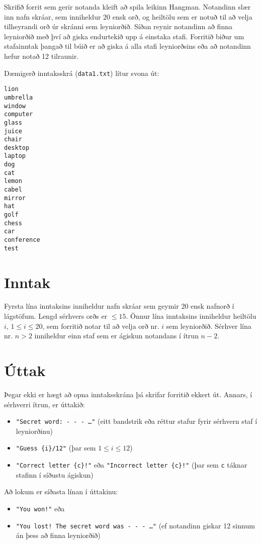 
Skrifið forrit sem gerir notanda kleift að spila leikinn Hangman.
Notandinn slær inn nafn skráar, sem inniheldur 20 ensk orð, og heiltölu sem er notuð til að velja tilheyrandi orð úr skránni sem leyniorðið.
Síðan reynir notandinn að finna leyniorðið með því að giska endurtekið upp á einstaka stafi. 
Forritið biður um stafainntak þangað til búið er að giska á alla stafi leyniorðsins eða að notandinn hefur notað 12 tilraunir.

Dæmigerð inntaksskrá (\texttt{data1.txt}) lítur svona út: 

\begin{verbatim}
lion
umbrella
window
computer
glass
juice
chair
desktop
laptop
dog
cat
lemon
cabel
mirror
hat
golf
chess
car
conference
test   
\end{verbatim}


\section*{Inntak}
Fyrsta lína inntaksins inniheldur nafn skráar sem geymir 20 ensk nafnorð í lágstöfum. 
Lengd sérhvers orðs er $\le 15$. 
Önnur lína inntaksins inniheldur heiltölu $i$, $1 \le i \le 20$, sem forritið notar til að velja orð nr. $i$ sem leyniorðið.
Sérhver lína nr. $n > 2$ inniheldur einn staf sem er ágiskun notandans í ítrun $n-2$.

\section*{Úttak}
Þegar ekki er hægt að opna inntaksskrána þá skrifar forritið ekkert út.
Annars, í sérhverri ítrun, er úttakið:
\begin{itemize}
    \item \texttt{"Secret word: - - - \ldots"} (eitt bandstrik eða réttur stafur fyrir sérhvern staf í leyniorðinu)
    \item \texttt{"Guess \{i\}/12"} (þar sem $1 \le i \le 12$)
    \item \texttt{"Correct letter \{c\}!"} eða \texttt{"Incorrect letter \{c\}!"} (þar sem \texttt{c} táknar stafinn í síðustu ágiskun)
\end{itemize}

Að lokum er síðasta línan í úttakinu: 
\begin{itemize}
    \item \texttt{"You won!"} eða
    \item \texttt{"You lost! The secret word was - - - \ldots"} (ef notandinn giskar 12 sinnum án þess að finna leyniorðið)
\end{itemize}
